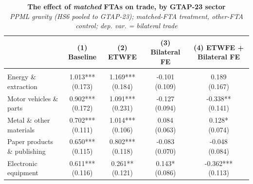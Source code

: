 \begin{table}[t]
\caption*{
{\fontsize{20}{25}\selectfont  \textbf{The effect of \emph{matched} FTAs on trade, by GTAP-23 sector}\fontsize{10}{12}\selectfont } \\ 
{\fontsize{14}{17}\selectfont  \emph{PPML gravity (HS6 pooled to GTAP-23); matched-FTA treatment, other-FTA control; dep. var. = bilateral trade}\fontsize{10}{12}\selectfont }
} 
\fontsize{10.0pt}{12.0pt}\selectfont
\begin{tabular*}{\linewidth}{@{\extracolsep{\fill}}l|cccc}
\toprule
 & {\bfseries (1) Baseline} & {\bfseries (2) ETWFE} & {\bfseries (3) Bilateral FE} & {\bfseries (4) ETWFE + Bilateral FE} \\ 
\midrule\addlinespace[2.5pt]
\multicolumn{5}{l}{{\itshape \bfseries A. Matched-FTA effect by GTAP-23 sector}} \\[2.5pt] 
\midrule\addlinespace[2.5pt]
Energy \& extraction & \shortstack[l]{1.013*** \\(0.173)} & \shortstack[l]{1.169*** \\(0.184)} & \shortstack[l]{-0.101 \\(0.109)} & \shortstack[l]{0.189 \\(0.167)} \\ 
Motor vehicles \& parts & \shortstack[l]{0.902*** \\(0.172)} & \shortstack[l]{1.091*** \\(0.231)} & \shortstack[l]{-0.127 \\(0.094)} & \shortstack[l]{-0.338** \\(0.141)} \\ 
Metal \& other materials & \shortstack[l]{0.702*** \\(0.111)} & \shortstack[l]{1.014*** \\(0.106)} & \shortstack[l]{0.084 \\(0.063)} & \shortstack[l]{0.128* \\(0.074)} \\ 
Paper products \& publishing & \shortstack[l]{0.650*** \\(0.115)} & \shortstack[l]{0.802*** \\(0.118)} & \shortstack[l]{-0.083 \\(0.070)} & \shortstack[l]{-0.048 \\(0.084)} \\ 
Electronic equipment & \shortstack[l]{0.611*** \\(0.116)} & \shortstack[l]{0.261** \\(0.121)} & \shortstack[l]{0.143* \\(0.086)} & \shortstack[l]{-0.362*** \\(0.113)} \\ 

\end{tabular*}
\end{table}
